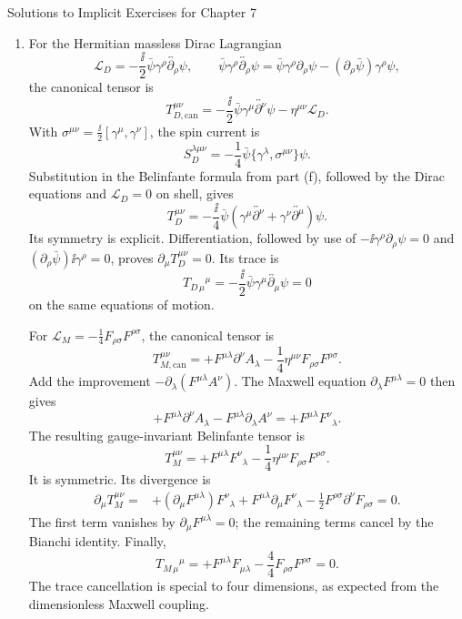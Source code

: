 \begin{bankssolutions}{Solutions to Implicit Exercises for Chapter 7}
\begin{enumerate}[label=(\alph*)]
\item For the Hermitian massless Dirac Lagrangian
\[
 \mathcal L_D=-\frac{\ii}{2}\bar\psi\gamma^\rho
 \overleftrightarrow{\partial_\rho}\psi,
 \qquad
 \bar\psi\gamma^\rho\overleftrightarrow{\partial_\rho}\psi
 =\bar\psi\gamma^\rho\partial_\rho\psi
 -(\partial_\rho\bar\psi)\gamma^\rho\psi,
\]
the canonical tensor is
\[
 T_{D,\mathrm{can}}^{\mu\nu}
 =-\frac{\ii}{2}\bar\psi\gamma^\mu
 \overleftrightarrow{\partial^\nu}\psi
 -\eta^{\mu\nu}\mathcal L_D.
\]
With
$\sigma^{\mu\nu}=\frac{\ii}{2}[\gamma^\mu,\gamma^\nu]$, the spin current is
\[
 S_D^{\lambda\mu\nu}
 =-\frac14\bar\psi\{\gamma^\lambda,\sigma^{\mu\nu}\}\psi.
\]
Substitution in the Belinfante formula from part (f), followed by the Dirac
equations and $\mathcal L_D=0$ on shell, gives
\[
 T_D^{\mu\nu}=-\frac{\ii}{4}\bar\psi\left(
 \gamma^\mu\overleftrightarrow{\partial^\nu}
 +\gamma^\nu\overleftrightarrow{\partial^\mu}\right)\psi.
\]
Its symmetry is explicit.  Differentiation, followed by use of
$-\ii\gamma^\rho\partial_\rho\psi=0$ and
$(\partial_\rho\bar\psi)\ii\gamma^\rho=0$, proves
$\partial_\mu T_D^{\mu\nu}=0$.  Its trace is
\[
 T_{D\,\mu}{}^\mu
 =-\frac{\ii}{2}\bar\psi\gamma^\mu
 \overleftrightarrow{\partial_\mu}\psi=0
\]
on the same equations of motion.

For $\mathcal L_M=-\frac14F_{\rho\sigma}F^{\rho\sigma}$, the canonical tensor
is
\[
 T_{M,\mathrm{can}}^{\mu\nu}
 =+F^{\mu\lambda}\partial^\nu A_\lambda
 -\frac14\eta^{\mu\nu}F_{\rho\sigma}F^{\rho\sigma}.
\]
Add the improvement $-\partial_\lambda(F^{\mu\lambda}A^\nu)$.  The Maxwell
equation $\partial_\lambda F^{\mu\lambda}=0$ then gives
\[
 +F^{\mu\lambda}\partial^\nu A_\lambda
 -F^{\mu\lambda}\partial_\lambda A^\nu
 =+F^{\mu\lambda}F^\nu{}_{\lambda}.
\]
The resulting gauge-invariant Belinfante tensor is
\[
 T_M^{\mu\nu}
 =+F^{\mu\lambda}F^\nu{}_{\lambda}
 -\frac14\eta^{\mu\nu}F_{\rho\sigma}F^{\rho\sigma}.
\]
It is symmetric.  Its divergence is
\begin{align*}
 \partial_\mu T_M^{\mu\nu}
 ={}&+(\partial_\mu F^{\mu\lambda})F^\nu{}_{\lambda}
 +F^{\mu\lambda}\partial_\mu F^\nu{}_{\lambda}
 -\frac12F^{\rho\sigma}\partial^\nu F_{\rho\sigma}=0.
\end{align*}
The first term vanishes by $\partial_\mu F^{\mu\lambda}=0$; the remaining
terms cancel by the Bianchi identity.  Finally,
\[
 T_{M\,\mu}{}^\mu
 =+F^{\mu\lambda}F_{\mu\lambda}
 -\frac44F_{\rho\sigma}F^{\rho\sigma}=0.
\]
The trace cancellation is special to four dimensions, as expected from the
dimensionless Maxwell coupling.


\end{enumerate}
\end{bankssolutions}
